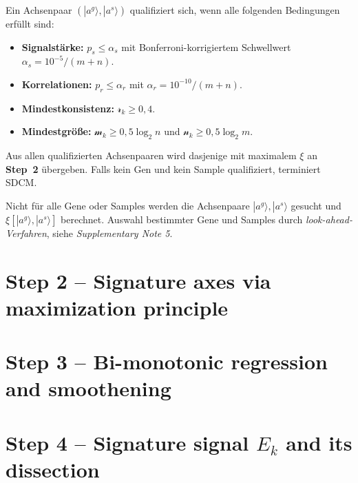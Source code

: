 Ein Achsenpaar $(|a^g\rangle, |a^s\rangle)$ qualifiziert sich, wenn
alle folgenden Bedingungen erf\"{u}llt sind:
 
\begin{itemize}
    \item \textbf{Signalst\"{a}rke:} $p_s \leq \alpha_s$
          mit Bonferroni-korrigiertem Schwellwert
          $\alpha_s = 10^{-5}/(m+n)$.
    \item \textbf{Korrelationen:} $p_r \leq \alpha_r$
          mit $\alpha_r = 10^{-10}/(m+n)$.
    \item \textbf{Mindestkonsistenz:} $\mathcal{r}_k \geq 0{,}4$.
    \item \textbf{Mindestgr\"{o}{\ss}e:}
          $\mathcal{m}_k \geq 0{,}5\log_2 n$
          und $\mathcal{n}_k \geq 0{,}5\log_2 m$.
\end{itemize}
 
Aus allen qualifizierten Achsenpaaren wird dasjenige mit maximalem
$\xi$ an \textbf{Step~2} \"{u}bergeben.
Falls kein Gen und kein Sample qualifiziert, terminiert SDCM.

Nicht für alle Gene oder Samples werden die Achsenpaare $|a^g\rangle, |a^s\rangle$ gesucht und $\xi[|a^g\rangle, |a^s\rangle]$ berechnet. Auswahl bestimmter Gene und Samples durch \textit{look-ahead-Verfahren}, siehe \textit{Supplementary Note 5}. 

























\section{Step 2 -- Signature axes via maximization principle}
















\section{Step 3 -- Bi-monotonic regression and smoothening}





\section{Step 4 -- Signature signal $E_k$ and its dissection}
